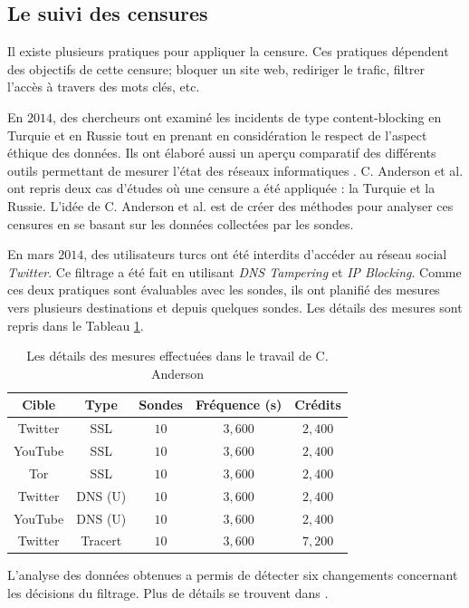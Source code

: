 \subsection{Le suivi des censures}

Il existe plusieurs pratiques pour appliquer la censure. Ces pratiques dépendent des objectifs de cette censure; bloquer un site web, rediriger le trafic, filtrer l'accès à travers des mots clés, etc.

En $2014$, des chercheurs ont examiné les incidents de type content-blocking en Turquie et en  Russie tout en prenant en considération le respect de l'aspect éthique des données. Ils ont  élaboré aussi un aperçu comparatif des différents outils permettant de mesurer l'état des réseaux informatiques \cite{Collin-Anderson}. C. Anderson et al. ont repris deux cas d'études où une censure a été appliquée : la Turquie et la Russie. L'idée de C. Anderson et al. est de créer des méthodes pour analyser ces censures en se basant sur les données collectées par les sondes. \par



En mars $2014$, des utilisateurs turcs ont été interdits d'accéder au réseau social  \textit{Twitter}.  Ce filtrage a été fait en utilisant \textit{DNS Tampering} et \textit{IP Blocking}. Comme ces deux pratiques sont évaluables avec les sondes, ils ont planifié des mesures vers plusieurs destinations et depuis quelques  sondes. Les détails des mesures sont  repris  dans le Tableau  \ref{ta:censorship-colin}.
\begin{table}[H]
	\centering
	\captionsetup{justification=centering}
	\begin{tabular}{ c c c c c}
		\textbf{Cible} &\textbf{Type} &	\textbf{Sondes} &\textbf{Fréquence (s)}	& \textbf{Crédits} \\ \hline
		Twitter &SSL &$ 10 $ &$ 3,600 $ &$ 2,400 $\\ \hline
		YouTube &SSL &$ 10 $ &$ 3,600 $ &$ 2,400 $ \\ \hline
		Tor & SSL &$ 10 $ &$ 3,600 $ &$ 2,400 $ \\ \hline
		Twitter & DNS (U) &$ 10 $ &$ 3,600 $ &$ 2,400 $ \\ \hline
		YouTube & DNS (U) &$ 10 $ &$ 3,600 $ &$ 2,400 $ \\ \hline
		Twitter &Tracert &$ 10 $ &$ 3,600 $ & $ 7,200 $ \\ \hline
	\end{tabular}
	\caption{Les détails des mesures effectuées dans le travail de C. Anderson \cite{Collin-Anderson} }
	\label{ta:censorship-colin}
\end{table}
L'analyse des données obtenues a permis de  détecter  six changements concernant les décisions du filtrage. Plus de détails se trouvent dans \cite{Collin-Anderson}.

